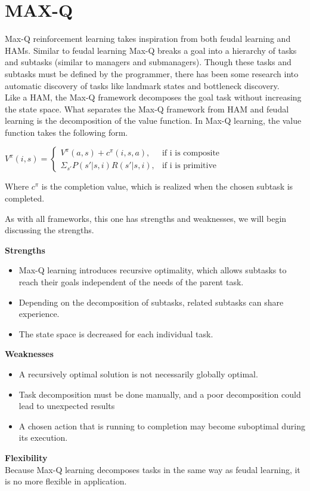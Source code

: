 \section{MAX-Q}
Max-Q reinforcement learning takes inspiration from both feudal learning and HAMs. Similar to feudal learning Max-Q breaks a goal into a hierarchy of tasks and subtasks (similar to managers and submanagers). Though these tasks and subtasks must be defined by the programmer, there has been some research into automatic discovery of tasks like landmark states and bottleneck discovery. \\

Like a HAM, the Max-Q framework decomposes the goal task without increasing the state space. What separates the Max-Q framework from HAM and feudal learning is the decomposition of the value function. In Max-Q learning, the value function takes the following form.

\begin{math}
V^{\pi}(i, s) = 
\begin{cases}
V^{\pi}(a, s) + c^{\pi}(i, s, a), & \text{if i is composite}\\
\Sigma_{s'}P(s'|s, i)R(s'|s, i), & \text{if i is primitive}
\end{cases}
\end{math}

Where $c^{\pi}$ is the completion value, which is realized when the chosen subtask is completed. 

As with all frameworks, this one has strengths and weaknesses, we will begin discussing the strengths.

\textbf{Strengths}
\begin{itemize}
    \item Max-Q learning introduces recursive optimality, which allows subtasks	to reach their goals independent of the needs of the parent task.
    \item Depending on the decomposition of subtasks, related subtasks can share experience.
    \item The state space is decreased for each individual task.
\end{itemize}

\textbf{Weaknesses}
\begin{itemize}
    \item A recursively optimal solution is not necessarily globally optimal. 
    \item Task decomposition must be done manually, and a poor decomposition could lead to unexpected results
    \item A chosen action that is running to completion may become suboptimal during its execution.
\end{itemize}

\textbf{Flexibility} \\
Because Max-Q learning decomposes tasks in the same way as feudal learning, it is no more flexible in application.

